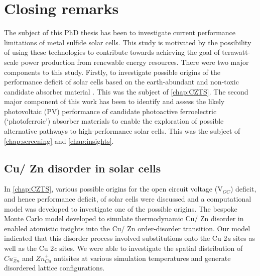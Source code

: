 \documentclass[11pt, twoside]{report}
\begin{document}








\chapter{Closing remarks}
The subject of this PhD thesis has been to investigate current performance limitations of metal sulfide solar cells. This study is motivated by the possibility of using these technologies to contribute towards achieving the goal of terawatt-scale power production from renewable energy resources. There were two major components to this study. Firstly, to investigate possible origins of the performance deficit of solar cells based on the earth-abundant and non-toxic candidate absorber material {\CZTS}. This was the subject of \autoref{chap:CZTS}. The second major component of this work has been to identify and assess the likely photovoltaic (PV) performance of candidate photoactive ferroelectric (`photoferroic') absorber materials to enable the exploration of possible alternative pathways to high-performance solar cells. This was the subject of \autoref{chap:screening} and \autoref{chap:insights}.

\section{Cu/ Zn disorder in {\CZTS} solar cells}
In \autoref{chap:CZTS}, various possible origins for the open circuit voltage (V$_{OC}$) deficit, and hence performance deficit, of {\CZTS} solar cells were discussed and a computational model was developed to investigate one of the possible origins. The bespoke Monte Carlo model developed to simulate thermodynamic Cu/ Zn disorder in {\CZTS} enabled atomistic insights into the Cu/ Zn order-disorder transition. Our model indicated that this disorder process involved substitutions onto the Cu 2\textit{a} sites as well as the Cu 2\textit{c} sites. We were able to investigate the spatial distribution of $Cu_{Zn}^{-}$ and $Zn_{Cu}^{+}$ antisites at various simulation temperatures and generate disordered lattice configurations.
\end{document}
